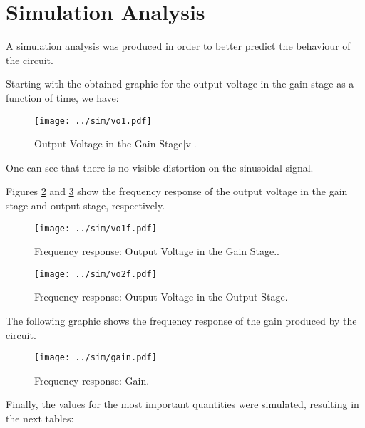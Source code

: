 \section{Simulation Analysis}
\label{sec:simulation}

\par A simulation analysis was produced in order to better predict the behaviour of the circuit.

\par Starting with the obtained graphic for the output voltage in the gain stage as a function of time, we have:

\begin{figure}[h] \centering
\texttt{[image: ../sim/vo1.pdf]}
\caption{Output Voltage in the Gain Stage[v].}
\label{fig:vgain}
\end{figure}

\par One can see that there is no visible distortion on the sinusoidal signal.

\newpage

\par Figures \ref{fig:freqvg} and \ref{fig:freqvo} show the frequency response of the output voltage in the gain stage and output stage, respectively.


\begin{figure}[h] \centering
\texttt{[image: ../sim/vo1f.pdf]}
\caption{Frequency response: Output Voltage in the Gain Stage..}
\label{fig:freqvg}
\end{figure}

\newpage

\begin{figure}[h] \centering
\texttt{[image: ../sim/vo2f.pdf]}
\caption{Frequency response: Output Voltage in the Output Stage.}
\label{fig:freqvo}
\end{figure}

\newpage

\par The following graphic shows the frequency response of the gain produced by the circuit.

\begin{figure}[h] \centering
\texttt{[image: ../sim/gain.pdf]}
\caption{Frequency response: Gain.}
\label{fig:freqgain}
\end{figure}

\newpage

\par Finally, the values for the most important quantities were simulated, resulting in the next tables:

